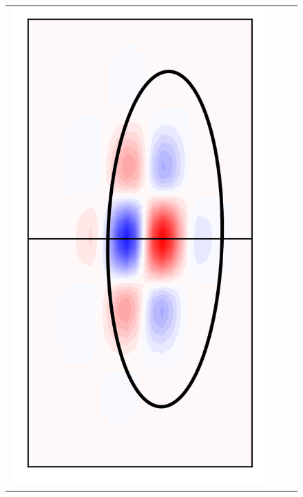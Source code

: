 \documentclass[10pt,final,xcolor=dvipsnames]{beamer}
\begin{document}
\begin{frame}
\begin{figure}
{\begin{tabular}{cccc}
	    \includegraphics[scale=0.2]{localpsf_revised_figures/frog_ellipsoid_a=20.0.png} & 

\end{tabular}}
\end{figure}
\end{frame}
\end{document}
